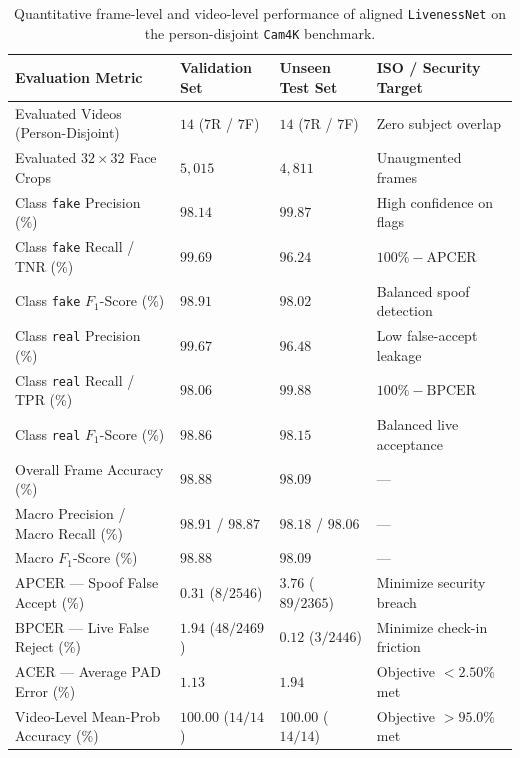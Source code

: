 \begin{table}[htbp]
\centering
\caption{Quantitative frame-level and video-level performance of aligned \texttt{LivenessNet} on the person-disjoint \texttt{Cam4K} benchmark.}
\label{tab:cam4k_metrics}
\small
\begin{tabular}{L{4.8cm}R{2.3cm}R{2.3cm}R{3.6cm}}
\toprule
\textbf{Evaluation Metric} & \textbf{Validation Set} & \textbf{Unseen Test Set} & \textbf{ISO / Security Target} \\
\midrule
Evaluated Videos (Person-Disjoint) & $14$ ($7$R / $7$F) & $14$ ($7$R / $7$F) & Zero subject overlap \\
Evaluated $32\times32$ Face Crops & $5{,}015$ & $4{,}811$ & Unaugmented frames \\
\midrule
Class \texttt{fake} Precision (\%) & $98.14$ & $\mathbf{99.87}$ & High confidence on flags \\
Class \texttt{fake} Recall / TNR (\%) & $99.69$ & $\mathbf{96.24}$ & $100\% - \text{APCER}$ \\
Class \texttt{fake} $F_1$-Score (\%) & $98.91$ & $\mathbf{98.02}$ & Balanced spoof detection \\
\midrule
Class \texttt{real} Precision (\%) & $99.67$ & $\mathbf{96.48}$ & Low false-accept leakage \\
Class \texttt{real} Recall / TPR (\%) & $98.06$ & $\mathbf{99.88}$ & $100\% - \text{BPCER}$ \\
Class \texttt{real} $F_1$-Score (\%) & $98.86$ & $\mathbf{98.15}$ & Balanced live acceptance \\
\midrule
Overall Frame Accuracy (\%) & $98.88$ & $\mathbf{98.09}$ & --- \\
Macro Precision / Macro Recall (\%) & $98.91$ / $98.87$ & $\mathbf{98.18}$ / $\mathbf{98.06}$ & --- \\
Macro $F_1$-Score (\%) & $98.88$ & $\mathbf{98.09}$ & --- \\
\midrule
$\text{APCER}$ --- Spoof False Accept (\%) & $0.31$ ($8/2546$) & $\mathbf{3.76}$ ($89/2365$) & Minimize security breach \\
$\text{BPCER}$ --- Live False Reject (\%) & $1.94$ ($48/2469$) & $\mathbf{0.12}$ ($3/2446$) & Minimize check-in friction \\
$\text{ACER}$ --- Average PAD Error (\%) & $1.13$ & $\mathbf{1.94}$ & Objective $< 2.50\%$ met \\
\midrule
Video-Level Mean-Prob Accuracy (\%) & $\mathbf{100.00}$ ($14/14$) & $\mathbf{100.00}$ ($14/14$) & Objective $> 95.0\%$ met \\
\bottomrule
\end{tabular}
\end{table}

